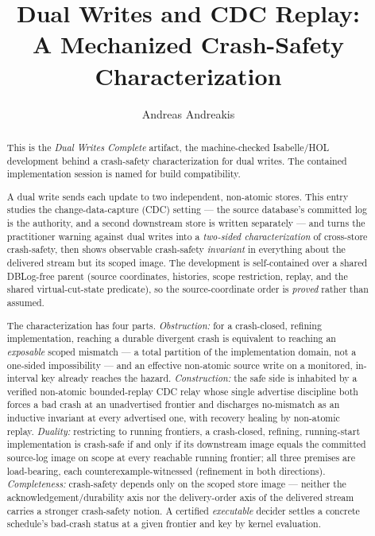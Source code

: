 \documentclass[11pt,a4paper]{article}
\begin{document}
\title{Dual Writes and CDC Replay:\\
  A Mechanized Crash-Safety Characterization}
\author{Andreas Andreakis}
\maketitle

\begin{abstract}
  This is the \emph{Dual Writes Complete} artifact, the machine-checked
  Isabelle/HOL development behind a crash-safety characterization for dual
  writes. The contained implementation session is named
   for build
  compatibility.

  A dual write sends each update to two independent, non-atomic stores. This
  entry studies the change-data-capture (CDC) setting --- the source database's
  committed log is the authority, and a second downstream store is written
  separately --- and turns the practitioner warning against dual writes into a
  \emph{two-sided characterization} of cross-store crash-safety, then shows
  observable crash-safety \emph{invariant} in everything about the delivered
  stream but its scoped image. The development is self-contained over a
  shared DBLog-free
   parent (source
  coordinates, histories, scope restriction, replay, and the shared
  virtual-cut-state predicate), so the source-coordinate order is \emph{proved}
  rather than assumed.

  The characterization has four parts. \emph{Obstruction:} for a crash-closed,
  refining implementation, reaching a durable divergent crash is equivalent to
  reaching an \emph{exposable} scoped mismatch --- a total partition of the
  implementation domain, not a one-sided impossibility --- and an effective
  non-atomic source write on a monitored, in-interval key already reaches the
  hazard. \emph{Construction:} the safe side is inhabited by a verified
  non-atomic bounded-replay CDC relay whose single advertise discipline both
  forces a bad crash at an unadvertised frontier and discharges no-mismatch as an
  inductive invariant at every advertised one, with recovery healing by
  non-atomic replay. \emph{Duality:} restricting to running frontiers, a
  crash-closed, refining, running-start implementation is crash-safe if and only
  if its downstream image equals the committed source-log image on scope at every
  reachable running frontier; all three premises are load-bearing, each
  counterexample-witnessed (refinement in both directions).
  \emph{Completeness:} crash-safety depends only on the scoped store image ---
  neither the acknowledgement/durability axis nor the delivery-order axis of the
  delivered stream carries a stronger crash-safety notion. A certified
  \emph{executable} decider settles a concrete schedule's bad-crash status at a
  given frontier and key by kernel evaluation.


\end{abstract}
\end{document}
